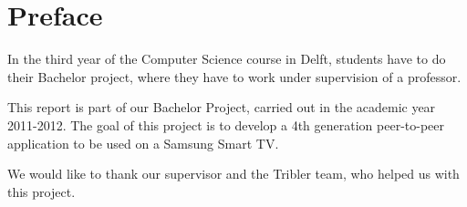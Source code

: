 \chapter*{Preface}
In the third year of the Computer Science course in Delft, students have to do their Bachelor project, 
where they have to work under supervision of a professor.

This report is part of our Bachelor Project, carried out in the academic year 2011-2012. The goal of this project is to develop a 4th generation peer-to-peer application to be used on a Samsung Smart TV.

We would like to thank our supervisor and the Tribler team, who helped us with this project.